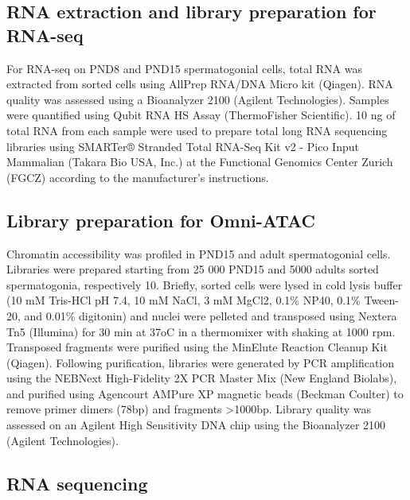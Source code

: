 \documentclass[12pt,twoside]{reedthesis}
\begin{document}
\hypertarget{rna-extraction-and-library-preparation-for-rna-seq}{%
\subsection{RNA extraction and library preparation for RNA-seq}\label{rna-extraction-and-library-preparation-for-rna-seq}}

For RNA-seq on PND8 and PND15 spermatogonial cells, total RNA was
extracted from sorted cells using AllPrep RNA/DNA Micro kit (Qiagen).
RNA quality was assessed using a Bioanalyzer 2100 (Agilent
Technologies). Samples were quantified using Qubit RNA HS Assay
(ThermoFisher Scientific). 10 ng of total RNA from each sample were used
to prepare total long RNA sequencing libraries using SMARTer® Stranded
Total RNA-Seq Kit v2 - Pico Input Mammalian (Takara Bio USA, Inc.) at
the Functional Genomics Center Zurich (FGCZ) according to the
manufacturer's instructions.

\hypertarget{library-preparation-for-omni-atac}{%
\subsection{Library preparation for Omni-ATAC}\label{library-preparation-for-omni-atac}}

Chromatin accessibility was profiled in PND15 and adult spermatogonial
cells. Libraries were prepared starting from 25 000 PND15 and 5000
adults sorted spermatogonia, respectively 10. Briefly, sorted cells were
lysed in cold lysis buffer (10 mM Tris-HCl pH 7.4, 10 mM NaCl, 3 mM
MgCl2, 0.1\% NP40, 0.1\% Tween-20, and 0.01\% digitonin) and nuclei were
pelleted and transposed using Nextera Tn5 (Illumina) for 30 min at 37oC
in a thermomixer with shaking at 1000 rpm. Transposed fragments were
purified using the MinElute Reaction Cleanup Kit (Qiagen). Following
purification, libraries were generated by PCR amplification using the
NEBNext High-Fidelity 2X PCR Master Mix (New England Biolabs), and
purified using Agencourt AMPure XP magnetic beads (Beckman Coulter) to
remove primer dimers (78bp) and fragments \textgreater1000bp. Library quality was
assessed on an Agilent High Sensitivity DNA chip using the Bioanalyzer
2100 (Agilent Technologies).

\hypertarget{rna-sequencing}{%
\subsection{RNA sequencing}\label{rna-sequencing}}
\end{document}
